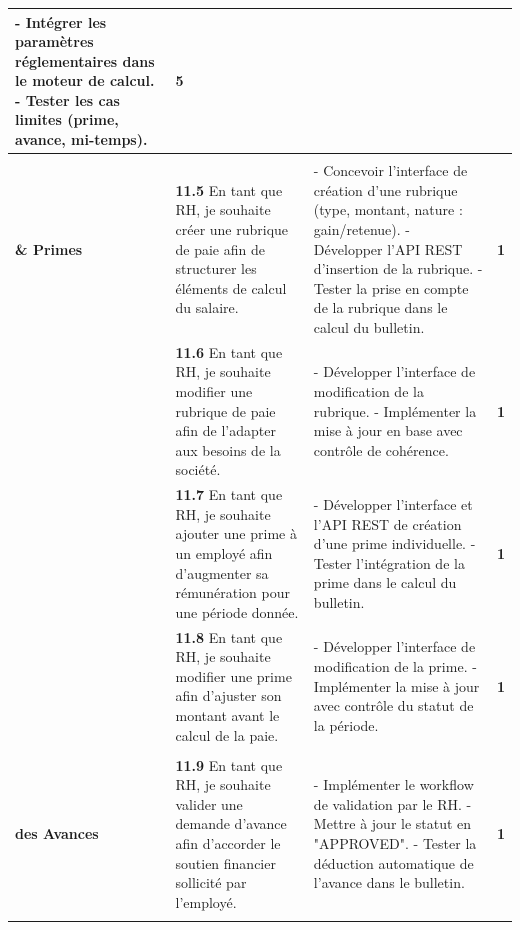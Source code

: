 \begin{small}
\begin{longtable}{|>{\raggedright\arraybackslash}p{2.8cm}|>{\raggedright\arraybackslash}p{6.2cm}|>{\raggedright\arraybackslash}p{6.2cm}|c|}
- Intégrer les paramètres réglementaires dans le moteur de calcul.\newline
- Tester les cas limites (prime, avance, mi-temps).
& \textbf{5} \\ \hline

\multirow{4}{*}{\makecell[c]{\textbf{Rubriques}\\ \textbf{\& Primes}}}
& \textbf{11.5} En tant que RH, je souhaite créer une rubrique de paie afin de structurer les éléments de calcul du salaire.
& - Concevoir l'interface de création d'une rubrique (type, montant, nature : gain/retenue).\newline
- Développer l'API REST d'insertion de la rubrique.\newline
- Tester la prise en compte de la rubrique dans le calcul du bulletin.
& \textbf{1} \\ \cline{2-4}

& \textbf{11.6} En tant que RH, je souhaite modifier une rubrique de paie afin de l'adapter aux besoins de la société.
& - Développer l'interface de modification de la rubrique.\newline
- Implémenter la mise à jour en base avec contrôle de cohérence.
& \textbf{1} \\ \cline{2-4}

& \textbf{11.7} En tant que RH, je souhaite ajouter une prime à un employé afin d'augmenter sa rémunération pour une période donnée.
& - Développer l'interface et l'API REST de création d'une prime individuelle.\newline
- Tester l'intégration de la prime dans le calcul du bulletin.
& \textbf{1} \\ \cline{2-4}

& \textbf{11.8} En tant que RH, je souhaite modifier une prime afin d'ajuster son montant avant le calcul de la paie.
& - Développer l'interface de modification de la prime.\newline
- Implémenter la mise à jour avec contrôle du statut de la période.
& \textbf{1} \\ \hline

\multirow{3}{*}{\makecell[c]{\textbf{Gestion}\\ \textbf{des Avances}}}
& \textbf{11.9} En tant que RH, je souhaite valider une demande d'avance afin d'accorder le soutien financier sollicité par l'employé.
& - Implémenter le workflow de validation par le RH.\newline
- Mettre à jour le statut en "APPROVED".\newline
- Tester la déduction automatique de l'avance dans le bulletin.
& \textbf{1} \\ \cline{2-4}


\end{longtable}
\end{small}
